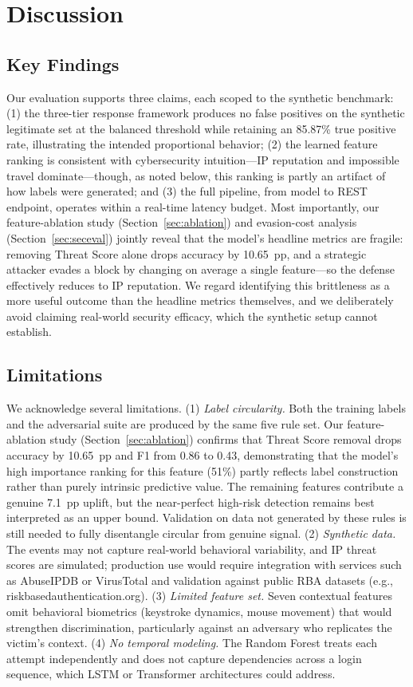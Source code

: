 \documentclass[conference]{IEEEtran}
\begin{document}
\section{Discussion}
\subsection{Key Findings}
Our evaluation supports three claims, each scoped to the synthetic benchmark: (1) the three-tier response framework produces no false positives on the synthetic legitimate set at the balanced threshold while retaining an 85.87\% true positive rate, illustrating the intended proportional behavior; (2) the learned feature ranking is consistent with cybersecurity intuition---IP reputation and impossible travel dominate---though, as noted below, this ranking is partly an artifact of how labels were generated; and (3) the full pipeline, from model to REST endpoint, operates within a real-time latency budget. Most importantly, our feature-ablation study (Section~\ref{sec:ablation}) and evasion-cost analysis (Section~\ref{sec:seceval}) jointly reveal that the model's headline metrics are fragile: removing Threat Score alone drops accuracy by 10.65~pp, and a strategic attacker evades a block by changing on average a single feature---so the defense effectively reduces to IP reputation. We regard identifying this brittleness as a more useful outcome than the headline metrics themselves, and we deliberately avoid claiming real-world security efficacy, which the synthetic setup cannot establish.

\subsection{Limitations}
We acknowledge several limitations. (1) \textit{Label circularity.} Both the training labels and the adversarial suite are produced by the same five rule set. Our feature-ablation study (Section~\ref{sec:ablation}) confirms that Threat Score removal drops accuracy by 10.65~pp and F1 from 0.86 to 0.43, demonstrating that the model's high importance ranking for this feature (51\%) partly reflects label construction rather than purely intrinsic predictive value. The remaining features contribute a genuine 7.1~pp uplift, but the near-perfect high-risk detection remains best interpreted as an upper bound. Validation on data not generated by these rules is still needed to fully disentangle circular from genuine signal. (2) \textit{Synthetic data.} The events may not capture real-world behavioral variability, and IP threat scores are simulated; production use would require integration with services such as AbuseIPDB or VirusTotal and validation against public RBA datasets (e.g., riskbasedauthentication.org). (3) \textit{Limited feature set.} Seven contextual features omit behavioral biometrics (keystroke dynamics, mouse movement) that would strengthen discrimination, particularly against an adversary who replicates the victim's context. (4) \textit{No temporal modeling.} The Random Forest treats each attempt independently and does not capture dependencies across a login sequence, which LSTM or Transformer architectures could address.
\end{document}
